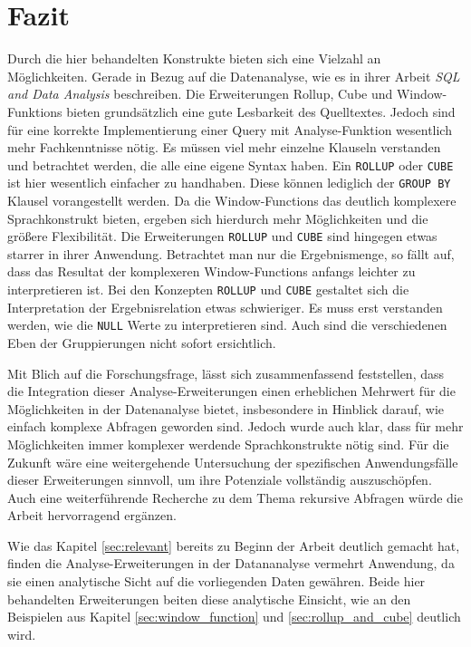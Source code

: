 \chapter{Fazit}
\label{chap:fazit} Durch die hier behandelten Konstrukte bieten sich eine Vielzahl
an Möglichkeiten. Gerade in Bezug auf die Datenanalyse, wie es \citet{FOTACHE2015243}
in ihrer Arbeit \textit{SQL and Data Analysis} beschreiben. Die Erweiterungen
Rollup, Cube und Window-Funktions bieten grundsätzlich eine gute Lesbarkeit des Quelltextes.
Jedoch sind für eine korrekte Implementierung einer Query mit Analyse-Funktion
wesentlich mehr Fachkenntnisse nötig. Es müssen viel mehr einzelne Klauseln verstanden
und betrachtet werden, die alle eine eigene Syntax haben. Ein \texttt{ROLLUP}
oder \texttt{CUBE} ist hier wesentlich einfacher zu handhaben. Diese können
lediglich der \texttt{GROUP BY} Klausel vorangestellt werden. Da die Window-Functions
das deutlich komplexere Sprachkonstrukt bieten, ergeben sich hierdurch mehr Möglichkeiten
und die größere Flexibilität. Die Erweiterungen \texttt{ROLLUP} und \texttt{CUBE}
sind hingegen etwas starrer in ihrer Anwendung. Betrachtet man nur die Ergebnismenge,
so fällt auf, dass das Resultat der komplexeren Window-Functions anfangs leichter
zu interpretieren ist. Bei den Konzepten \texttt{ROLLUP} und \texttt{CUBE}
gestaltet sich die Interpretation der Ergebnisrelation etwas schwieriger. Es muss
erst verstanden werden, wie die \texttt{NULL} Werte zu interpretieren sind. Auch
sind die verschiedenen Eben der Gruppierungen nicht sofort ersichtlich.

Mit Blich auf die Forschungsfrage, lässt sich zusammenfassend feststellen, dass
die Integration dieser Analyse-Erweiterungen einen erheblichen Mehrwert für die
Möglichkeiten in der Datenanalyse bietet, insbesondere in Hinblick darauf, wie
einfach komplexe Abfragen geworden sind. Jedoch wurde auch klar, dass für mehr
Möglichkeiten immer komplexer werdende Sprachkonstrukte nötig sind. Für die Zukunft
wäre eine weitergehende Untersuchung der spezifischen Anwendungsfälle dieser Erweiterungen
sinnvoll, um ihre Potenziale vollständig auszuschöpfen. Auch eine weiterführende
Recherche zu dem Thema rekursive Abfragen würde die Arbeit hervorragend ergänzen.

Wie das Kapitel \ref{sec:relevant} bereits zu Beginn der Arbeit deutlich gemacht
hat, finden die Analyse-Erweiterungen in der Datananalyse vermehrt Anwendung, da
sie einen analytische Sicht auf die vorliegenden Daten gewähren. Beide hier
behandelten Erweiterungen beiten diese analytische Einsicht, wie an den Beispielen
aus Kapitel \ref{sec:window_function} und \ref{sec:rollup_and_cube} deutlich wird.